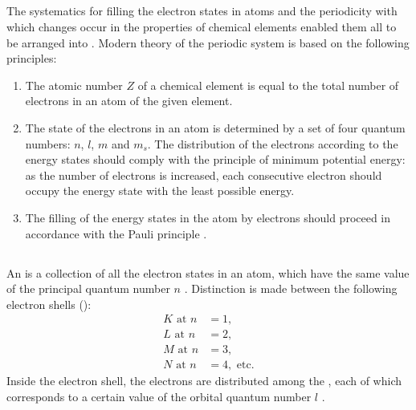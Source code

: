\subsection{}\label{39.3.5} The systematics for filling the electron states in atoms and the periodicity with which changes occur in the properties of chemical elements enabled them all to be arranged into . Modern theory of the periodic system is based on the following principles:
\begin{enumerate}[label=(\alph*),noitemsep]
\item The atomic number $Z$ of a chemical element is equal to the total number of electrons in an atom of the given element.
\item The state of the electrons in an atom is determined by a set of four quantum numbers: $n$, $l$, $m$ and $m_{s}$. The distribution of the electrons according to the energy states should comply with the principle of minimum potential energy: as the number of electrons is increased, each consecutive electron should occupy the energy state with the least possible energy.
\item The filling of the energy states in the atom by electrons should proceed in accordance with the Pauli principle .
\end{enumerate}

\subsection{}\label{39.3.6} An  is a collection of all the electron states in an atom, which have the same value of the principal quantum number $n$ . Distinction is made between the following electron shells (): 
\begin{align*}%
K \text{ at } n & = 1,\\
L  \text{ at } n & = 2,\\
M   \text{ at } n & = 3,\\
N  \text{ at } n & = 4, \text{ etc}.
\end{align*}
Inside the electron shell, the electrons are distributed among
the , each of which corresponds to a certain value of the orbital quantum number $l$ .

